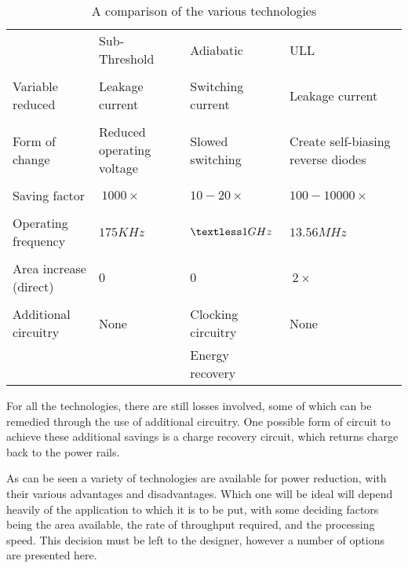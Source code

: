 \begin{table*}[htbp]
	\centering
	\begin{tabular}[width=\columnwidth]{| l | l | l | l |}
		\hline
					& Sub-Threshold			& Adiabatic		& ULL					\\ &&& \\
		\hline
		Variable reduced	& Leakage current		& Switching current	& Leakage current			\\ &&& \\
		Form of change		& Reduced operating voltage	& Slowed switching	& Create self-biasing reverse diodes	\\ &&& \\
		Saving factor 		& $~1000\times$			& $10-20\times$		& $100-10000\times$			\\ &&& \\
		Operating frequency	& $175KHz$			& $\textless 1GHz$	& $13.56MHz$				\\ &&& \\
		Area increase (direct)	& $0$				& $0$			& $~2\times$				\\ &&& \\
		Additional circuitry	& None				& Clocking circuitry	& None					\\
					& 				& Energy recovery	& 					\\
		\hline 
	\end{tabular}
	\caption{A comparison of the various technologies}
	\label{tab:comparison}
\end{table*}

For all the technologies, there are still losses involved, some of which can be remedied through the use of additional circuitry.
One possible form of circuit to achieve these additional savings is a charge recovery circuit, which returns charge back to the power rails.

As can be seen a variety of technologies are available for power reduction, with their various advantages and disadvantages.
Which one will be ideal will depend heavily of the application to which it is to be put, with some deciding factors being the area available, the rate of throughput required, and the processing speed.
This decision must be left to the designer, however a number of options are presented here.
